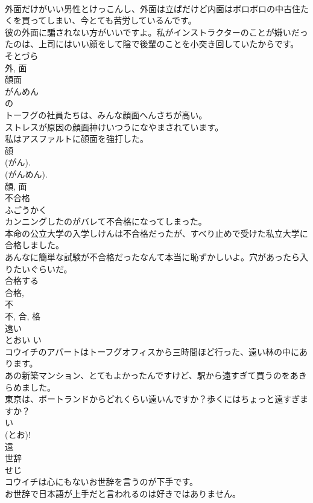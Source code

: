 \documentclass[8pt]{extreport}
\begin{document}
\begin{CJK}{UTF8}{min}
\\	外面だけがいい男性とけっこんし、外面は立ぱだけど内面はボロボロの中古住たくを買ってしまい、今とても苦労しているんです。	
\\	彼の外面に騙されない方がいいですよ。私がインストラクターのことが嫌いだったのは、上司にはいい顔をして陰で後輩のことを小突き回していたからです。	
\\	そとづら 
\\	外, 面	
\\	顔面	
\\	がんめん	
\\	の 
\\	トーフグの社員たちは、みんな顔面へんさちが高い。	
\\	ストレスが原因の顔面神けいつうになやまされています。	
\\	私はアスファルトに顔面を強打した。	
\\	顔 
\\	(がん). 
\\	(がんめん). 
\\	顔, 面	
\\	不合格	
\\	ふごうかく	
\\	カンニングしたのがバレて不合格になってしまった。	
\\	本命の公立大学の入学しけんは不合格だったが、すべり止めで受けた私立大学に合格しました。	
\\	あんなに簡単な試験が不合格だったなんて本当に恥ずかしいよ。穴があったら入りたいぐらいだ。	
\\	合格する 
\\	合格, 
\\	不 
\\	不, 合, 格	
\\	遠い	
\\	とおい	い 
\\	コウイチのアパートはトーフグオフィスから三時間ほど行った、遠い林の中にあります。	
\\	あの新築マンション、とてもよかったんですけど、駅から遠すぎて買うのをあきらめました。	
\\	東京は、ポートランドからどれくらい遠いんですか？歩くにはちょっと遠すぎますか？	
\\	い 
\\	(とお)! 
\\	遠	
\\	世辞	
\\	せじ	
\\	コウイチは心にもないお世辞を言うのが下手です。	
\\	お世辞で日本語が上手だと言われるのは好きではありません。	

\end{CJK}
\end{document}
